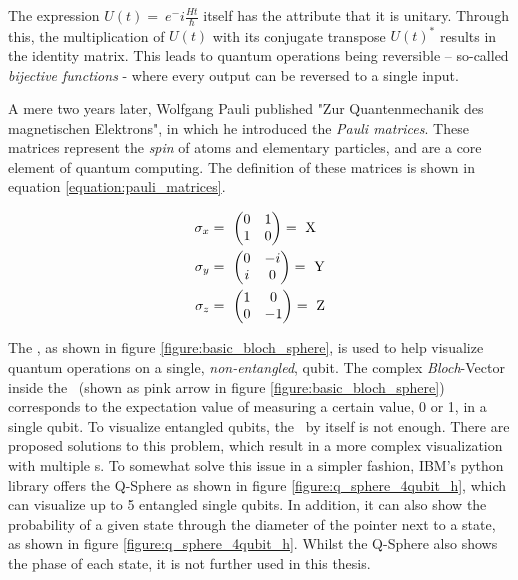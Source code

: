 The expression $U(t) =\ e^-i\frac{Ht}{\hbar}$ itself has the attribute that it is unitary. Through this, the multiplication of $U(t)$ with its conjugate transpose $U(t)^\ast$ results in the identity matrix. This leads to quantum operations being reversible – so-called \emph{bijective functions} - where every output can be reversed to a single input. \par
A mere two years later, Wolfgang Pauli published "Zur Quantenmechanik des magnetischen Elektrons"\cite{pauli_zur_1927}, in which he introduced the \emph{Pauli matrices}. These matrices represent the \emph{spin} of atoms and elementary particles, and are a core element of quantum computing. The definition of these matrices is shown in equation \ref{equation:pauli_matrices}.

\begin{equation}
    \centering
    \begin{split}
        \sigma_x &=\ \begin{pmatrix}0 & 1 \\ 1 & 0\end{pmatrix} =\ \mathrm{X}\\
        \sigma_y &=\ \begin{pmatrix}0 & -i \\ i & 0\end{pmatrix} =\ \mathrm{Y}\\
        \sigma_z &=\ \begin{pmatrix}1 & 0 \\ 0 & -1\end{pmatrix} =\ \mathrm{Z}\\
    \end{split}
    \label{equation:pauli_matrices}
\end{equation}

\newpage

The \bloch\cite{michael_a_nielsen_quantum_2000}, as shown in figure \ref{figure:basic_bloch_sphere}, is used to help visualize quantum operations on a single, \emph{non-entangled}, qubit. The complex \emph{Bloch}-Vector inside the \bloch\ (shown as pink arrow in figure \ref{figure:basic_bloch_sphere}) corresponds to the expectation value of measuring a certain value, 0 or 1, in a single qubit. To visualize entangled qubits, the \bloch\ by itself is not enough. There are proposed solutions to this problem\cite{gamel_entangled_2016}, which result in a more complex visualization with multiple \bloch s. To somewhat solve this issue in a simpler fashion, IBM's python library  offers the Q-Sphere\cite{ibm_quantum_visualizations_nodate} as shown in figure \ref{figure:q_sphere_4qubit_h}, which can visualize up to 5 entangled single qubits. In addition, it can also show the probability of a given state through the diameter of the pointer next to a state, as shown in figure \ref{figure:q_sphere_4qubit_h}. Whilst the Q-Sphere also shows the phase of each state, it is not further used in this thesis.

